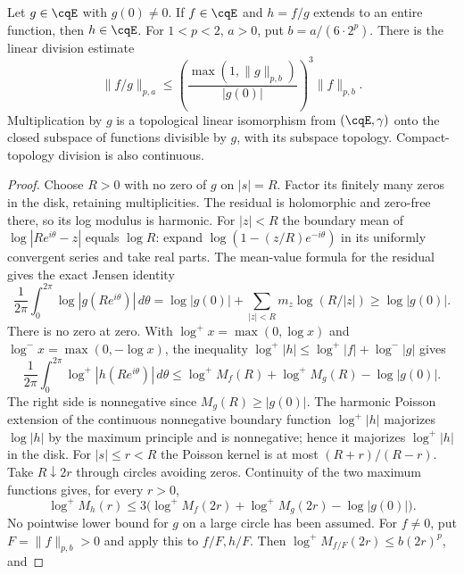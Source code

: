\begin{cqlemma}
\label{thm:cq-division}
Let $g\in\cqE$ with $g(0)\ne0$. If $f\in\cqE$ and $h=f/g$
extends to an entire function, then $h\in\cqE$. For $1<p<2$,
$a>0$, put $b=a/(6\cdot2^p)$. There is the linear division estimate
\begin{equation}\label{eq:cq-division-bound}
 \|f/g\|_{p,a}\leq
 \left(\frac{\max(1,\|g\|_{p,b})}{|g(0)|}\right)^3
 \|f\|_{p,b}.
\end{equation}
Multiplication by $g$ is a topological linear isomorphism from
$(\cqE,\gamma)$ onto the closed subspace of functions divisible by
$g$, with its subspace topology. Compact-topology division is also
continuous.
\end{cqlemma}
\begin{proof}
Choose $R>0$ with no zero of $g$ on $|s|=R$. Factor its finitely
many zeros in the disk, retaining multiplicities. The residual is
holomorphic and zero-free there, so its log modulus is harmonic.
For $|z|<R$ the boundary mean of $\log|Re^{i\theta}-z|$ equals
$\log R$: expand $\log(1-(z/R)e^{-i\theta})$ in its uniformly
convergent series and take real parts. The mean-value formula for
the residual gives the exact Jensen identity
\[
 \frac1{2\pi}\int_0^{2\pi}\log|g(Re^{i\theta})|\,d\theta
 =\log|g(0)|+\sum_{|z|<R}m_z\log(R/|z|)\geq\log|g(0)|.
\]
There is no zero at zero. With
$\log^+x=\max(0,\log x)$ and $\log^-x=\max(0,-\log x)$,
the inequality $\log^+|h|\leq\log^+|f|+\log^-|g|$ gives
\begin{equation}\label{eq:cq-division-mean}
 \frac1{2\pi}\int_0^{2\pi}\log^+|h(Re^{i\theta})|\,d\theta
 \leq\log^+M_f(R)+\log^+M_g(R)-\log|g(0)|.
\end{equation}
The right side is nonnegative since $M_g(R)\geq|g(0)|$.
The harmonic Poisson extension of the continuous nonnegative boundary
function $\log^+|h|$ majorizes $\log|h|$ by the maximum principle
and is nonnegative; hence it majorizes $\log^+|h|$ in the disk.
For $|s|\leq r<R$ the Poisson kernel is at most $(R+r)/(R-r)$.
Take $R\downarrow2r$ through circles avoiding zeros. Continuity of
the two maximum functions gives, for every $r>0$,
\begin{equation}\label{eq:cq-division-radial}
 \log^+M_h(r)\leq
 3\bigl(\log^+M_f(2r)+\log^+M_g(2r)-\log|g(0)|\bigr).
\end{equation}
No pointwise lower bound for $g$ on a large circle has been assumed.
For $f\ne0$, put $F=\|f\|_{p,b}>0$ and apply this to $f/F,h/F$.
Then $\log^+M_{f/F}(2r)\leq b(2r)^p$, and

\end{proof}
